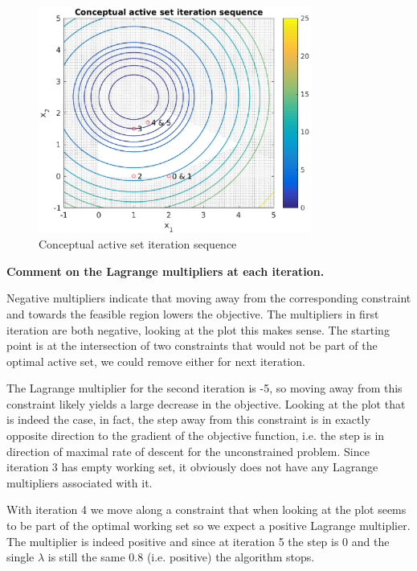 \begin{figure}
    \centering
    \includegraphics[width = 0.8\textwidth]{fig_3_2.eps}
    \caption{Conceptual active set iteration sequence}
    \label{fig:3_2}
\end{figure}



\textbf{Comment on the Lagrange multipliers at each iteration.}

Negative multipliers indicate that moving away from the corresponding constraint and towards the feasible region lowers the objective. The multipliers in first iteration are both negative, looking at the plot this makes sense. The starting point is at the intersection of two constraints that would not be part of the optimal active set, we could remove either for next iteration.

The Lagrange multiplier for the second iteration is -5, so moving away from this constraint likely yields a large decrease in the objective. Looking at the plot that is indeed the case, in fact, the step away from this constraint is in exactly opposite direction to the gradient of the objective function, i.e. the step is in direction of maximal rate of descent for the unconstrained problem. Since iteration 3 has empty working set, it obviously does not have any Lagrange multipliers associated with it.

With iteration 4 we move along a constraint that when looking at the plot seems to be part of the optimal working set so we expect a positive Lagrange multiplier. The multiplier is indeed positive and since at iteration 5 the step is 0 and the single $\lambda$ is still the same 0.8 (i.e. positive) the algorithm stops.


